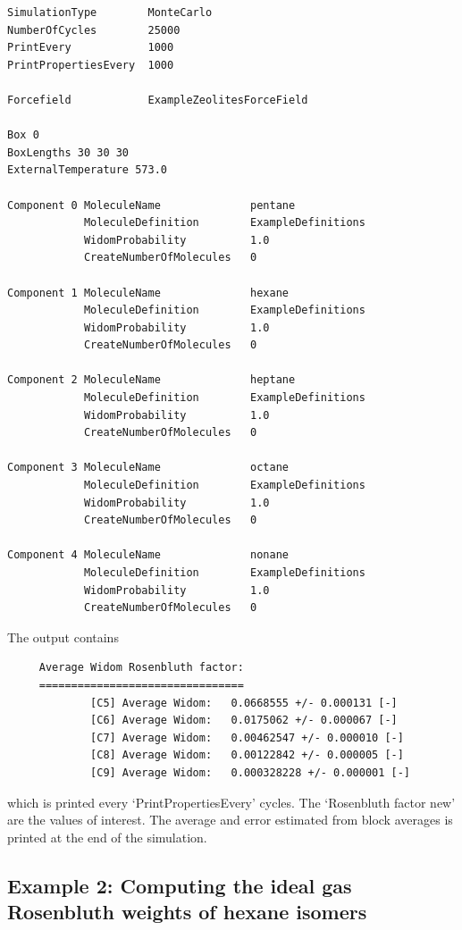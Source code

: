 \begin{tiny}
\begin{verbatim}
SimulationType        MonteCarlo
NumberOfCycles        25000
PrintEvery            1000
PrintPropertiesEvery  1000

Forcefield            ExampleZeolitesForceField

Box 0
BoxLengths 30 30 30
ExternalTemperature 573.0

Component 0 MoleculeName              pentane
            MoleculeDefinition        ExampleDefinitions
            WidomProbability          1.0
            CreateNumberOfMolecules   0

Component 1 MoleculeName              hexane
            MoleculeDefinition        ExampleDefinitions
            WidomProbability          1.0
            CreateNumberOfMolecules   0

Component 2 MoleculeName              heptane
            MoleculeDefinition        ExampleDefinitions
            WidomProbability          1.0
            CreateNumberOfMolecules   0

Component 3 MoleculeName              octane
            MoleculeDefinition        ExampleDefinitions
            WidomProbability          1.0
            CreateNumberOfMolecules   0

Component 4 MoleculeName              nonane
            MoleculeDefinition        ExampleDefinitions
            WidomProbability          1.0
            CreateNumberOfMolecules   0
\end{verbatim}
\end{tiny}
\noindent
The output contains 
\begin{tiny}
\begin{verbatim}
     Average Widom Rosenbluth factor:
     ================================
             [C5] Average Widom:   0.0668555 +/- 0.000131 [-]
             [C6] Average Widom:   0.0175062 +/- 0.000067 [-]
             [C7] Average Widom:   0.00462547 +/- 0.000010 [-]
             [C8] Average Widom:   0.00122842 +/- 0.000005 [-]
             [C9] Average Widom:   0.000328228 +/- 0.000001 [-]
\end{verbatim}
\end{tiny}
which is printed every `PrintPropertiesEvery' cycles. The `Rosenbluth factor new' are the values of interest.
The average and error estimated from block averages is printed at the end
of the simulation.

\subsection*{Example 2: Computing the ideal gas Rosenbluth weights of hexane isomers}

